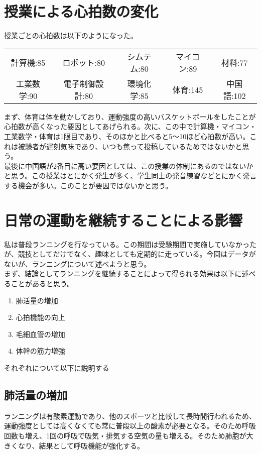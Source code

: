\documentclass[a4paper,12pt, uplatex, fleqn]{jsarticle}
\begin{document}
\section{授業による心拍数の変化}
    授業ごとの心拍数は以下のようになった。
    \begin{table}[htbp]
        \begin{center}
        \begin{tabular}{ccccc}
            計算機:85 & ロボット:80 & シムテム:80 & マイコン:89 & 材料:77 \\
            工業数学:90 & 電子制御設計:80 & 環境化学:85 & 体育:145 & 中国語:102 \\
        \end{tabular}

        \end{center}
    \end{table}

    まず、体育は体を動かしており、運動強度の高いバスケットボールをしたことが心拍数が高くなった要因としてあげられる。次に、この中で計算機・マイコン・工業数学・体育は1限目であり、そのほかと比べると5〜10ほど心拍数が高い。これは被験者が遅刻気味であり、いつも焦って投稿しているためではないかと思う。\\
    最後に中国語が2番目に高い要因としては、この授業の体制にあるのではないかと思う。この授業はとにかく発生が多く、学生同士の発音練習などとにかく発言する機会が多い。このことが要因ではないかと思う。


\section{日常の運動を継続することによる影響}
    私は普段ランニングを行なっている。この期間は受験期間で実施していなかったが、競技としてだけでなく、趣味としても定期的に走っている。今回はデータがないが、ランニングについて述べようと思う。\\
    まず、結論としてランニングを継続することによって得られる効果は以下に述べることがあると思う。

    \begin{enumerate}
        \item 肺活量の増加
        \item 心拍機能の向上
        \item 毛細血管の増加
        \item 体幹の筋力増強
    \end{enumerate}

    それぞれについて以下に説明する
    \subsection{肺活量の増加}
        ランニングは有酸素運動であり、他のスポーツと比較して長時間行われるため、運動強度としては高くなくても常に普段以上の酸素が必要となる。そのため呼吸回数も増え、1回の呼吸で吸気・排気する空気の量も増える。そのため肺胞が大きくなり、結果として呼吸機能が強化する。
\end{document}
